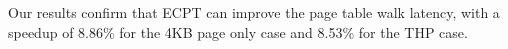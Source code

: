 Our results confirm that ECPT can improve the page table walk latency,
	with a speedup of 8.86\% for the 4KB page only case and 8.53\% for the THP case.


